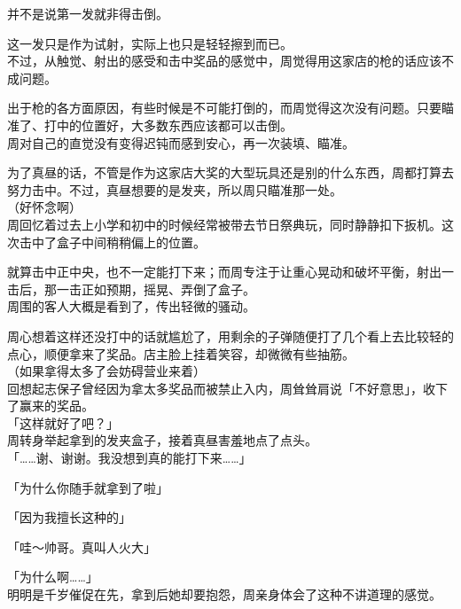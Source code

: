 并不是说第一发就非得击倒。

这一发只是作为试射，实际上也只是轻轻擦到而已。\\

不过，从触觉、射出的感受和击中奖品的感觉中，周觉得用这家店的枪的话应该不成问题。

出于枪的各方面原因，有些时候是不可能打倒的，而周觉得这次没有问题。只要瞄准了、打中的位置好，大多数东西应该都可以击倒。\\

周对自己的直觉没有变得迟钝而感到安心，再一次装填、瞄准。

为了真昼的话，不管是作为这家店大奖的大型玩具还是别的什么东西，周都打算去努力击中。不过，真昼想要的是发夹，所以周只瞄准那一处。\\

（好怀念啊）\\

周回忆着过去上小学和初中的时候经常被带去节日祭典玩，同时静静扣下扳机。这次击中了盒子中间稍稍偏上的位置。

就算击中正中央，也不一定能打下来；而周专注于让重心晃动和破坏平衡，射出一击后，那一击正如预期，摇晃、弄倒了盒子。\\

周围的客人大概是看到了，传出轻微的骚动。

周心想着这样还没打中的话就尴尬了，用剩余的子弹随便打了几个看上去比较轻的点心，顺便拿来了奖品。店主脸上挂着笑容，却微微有些抽筋。\\

（如果拿得太多了会妨碍营业来着）\\

回想起志保子曾经因为拿太多奖品而被禁止入内，周耸耸肩说「不好意思」，收下了赢来的奖品。\\

「这样就好了吧？」\\

周转身举起拿到的发夹盒子，接着真昼害羞地点了点头。\\

「……谢、谢谢。我没想到真的能打下来……」

「为什么你随手就拿到了啦」

「因为我擅长这种的」

「哇～帅哥。真叫人火大」

「为什么啊……」\\

明明是千岁催促在先，拿到后她却要抱怨，周亲身体会了这种不讲道理的感觉。\\

